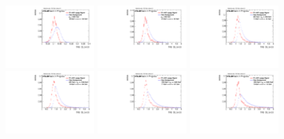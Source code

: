 \begin{figure}
\includegraphics[width=0.3\textwidth]{sascha_input/Appendix/Distributions/w/distributions/beta05/h_assisted_tj_C2_05_bin6.pdf} 
\bigskip
\includegraphics[width=0.3\textwidth]{sascha_input/Appendix/Distributions/w/distributions/beta05/h_assisted_tj_D2_05_bin1.pdf} \hspace{1mm}
\includegraphics[width=0.3\textwidth]{sascha_input/Appendix/Distributions/w/distributions/beta05/h_assisted_tj_D2_05_bin2.pdf} \hspace{1mm}
\includegraphics[width=0.3\textwidth]{sascha_input/Appendix/Distributions/w/distributions/beta05/h_assisted_tj_D2_05_bin3.pdf} 
\bigskip
\includegraphics[width=0.3\textwidth]{sascha_input/Appendix/Distributions/w/distributions/beta05/h_assisted_tj_D2_05_bin4.pdf} \hspace{1mm}
\includegraphics[width=0.3\textwidth]{sascha_input/Appendix/Distributions/w/distributions/beta05/h_assisted_tj_D2_05_bin5.pdf} \hspace{1mm}

\end{figure}
